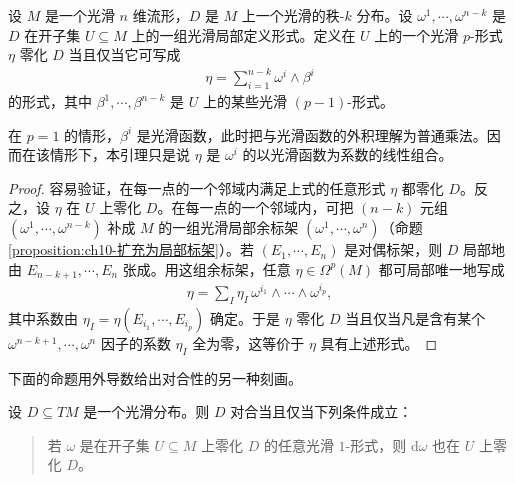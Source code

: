 \documentclass[../../main.tex]{subfiles}
\begin{document}
\begin{lemma}\label{lemma:ch19-零化形式结构}
设 $M$ 是一个光滑 $n$ 维流形，$D$ 是 $M$ 上一个光滑的秩-$k$ 分布。设 $\omega^1,\cdots ,\omega^{n-k}$ 是 $D$ 在开子集 $U\subseteq M$ 上的一组光滑局部定义形式。定义在 $U$ 上的一个光滑 $p$-形式 $\eta$ 零化 $D$ 当且仅当它可写成
\begin{align}
\eta=\sum_{i=1}^{n-k}\omega^i\wedge\beta^i
\end{align}
的形式，其中 $\beta^1,\cdots ,\beta^{n-k}$ 是 $U$ 上的某些光滑 $(p-1)$-形式。
\end{lemma}

\begin{remark}
在 $p=1$ 的情形，$\beta^i$ 是光滑函数，此时把与光滑函数的外积理解为普通乘法。因而在该情形下，本引理只是说 $\eta$ 是 $\omega^i$ 的以光滑函数为系数的线性组合。
\end{remark}

\begin{proof}
容易验证，在每一点的一个邻域内满足上式的任意形式 $\eta$ 都零化 $D$。反之，设 $\eta$ 在 $U$ 上零化 $D$。在每一点的一个邻域内，可把 $(n-k)$ 元组 $(\omega^1,\cdots ,\omega^{n-k})$ 补成 $M$ 的一组光滑局部余标架 $(\omega^1,\cdots ,\omega^n)$（命题\cref{proposition:ch10-扩充为局部标架}）。若 $(E_1,\cdots ,E_n)$ 是对偶标架，则 $D$ 局部地由 $E_{n-k+1},\cdots ,E_n$ 张成。用这组余标架，任意 $\eta\in\Omega^p(M)$ 都可局部唯一地写成
\begin{align*}
\eta=\sum_I \eta_I\,\omega^{i_1}\wedge\cdots\wedge\omega^{i_p},
\end{align*}
其中系数由 $\eta_I=\eta(E_{i_1},\cdots ,E_{i_p})$ 确定。于是 $\eta$ 零化 $D$ 当且仅当凡是含有某个 $\omega^{n-k+1},\cdots ,\omega^n$ 因子的系数 $\eta_I$ 全为零，这等价于 $\eta$ 具有上述形式。
\end{proof}

下面的命题用外导数给出对合性的另一种刻画。

\begin{proposition}\label{proposition:ch19-对合外导判别}
设 $D\subseteq TM$ 是一个光滑分布。则 $D$ 对合当且仅当下列条件成立：
\begin{quote}
若 $\omega$ 是在开子集 $U\subseteq M$ 上零化 $D$ 的任意光滑 $1$-形式，则 $\mathrm{d}\omega$ 也在 $U$ 上零化 $D$。
\end{quote}
\end{proposition}
\end{document}
